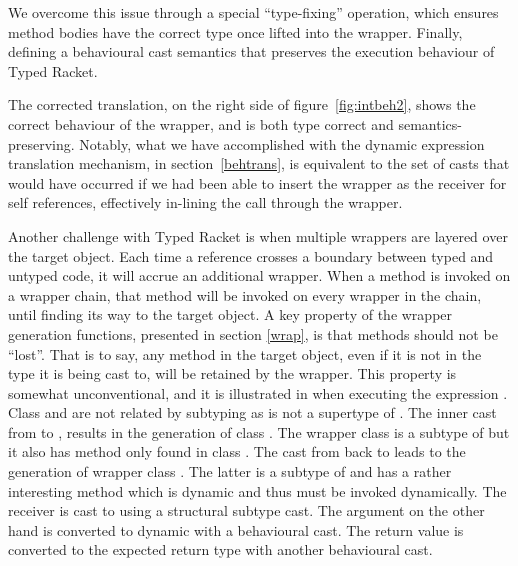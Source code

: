 \documentclass[a4paper,USenglish]{tex/lipics-v2016}
\begin{document}
We overcome this issue through a special ``type-fixing'' operation, 
which ensures method bodies have the correct type 
once lifted into the wrapper. Finally, defining a behavioural cast semantics 
that preserves the execution behaviour of Typed Racket.

The corrected translation, on the right side of
figure~\ref{fig:intbeh2}, shows the correct behaviour of the wrapper, and
is both type correct and semantics-preserving. Notably, what we have
accomplished with the dynamic expression translation mechanism, in
section~\ref{behtrans}, is equivalent to the set of casts that would have occurred
if we had been able to insert the wrapper as the receiver for self references,
effectively in-lining the call through the wrapper.

Another challenge with Typed Racket is when multiple wrappers are layered 
over the target object. Each time a reference crosses a boundary between typed and untyped code,
it will accrue an additional wrapper. When a method is invoked on a wrapper
chain, that method will be invoked on every wrapper in the chain, until finding its way to
the target object. A key property of the wrapper generation functions, presented in section
\ref{wrap}, is that methods should not be ``lost''. That is to say, any method
in the target object, even if it is not in the type it is being cast to, will be
retained by the wrapper.  This property is somewhat unconventional, and it is 
illustrated in  when executing the expression \BehCast\C{(\BehCast\D{\New\C{}})}. 
Class \C and \D are not related by subtyping as \any is not a supertype of \E. The inner cast from \C to
\D, results in the generation of class . The wrapper class is a
subtype of \D but it also has method \mp only found in class \C.  The cast from
 back to \C leads to the generation of wrapper class .
The latter is a subtype of \C and has a rather interesting method \m which is
dynamic and thus must be invoked dynamically. The receiver is cast to \any using
a structural subtype cast. The argument on the other hand is converted to dynamic with a
behavioural cast. The return value is converted to the expected return type with
another behavioural cast.
\end{document}
